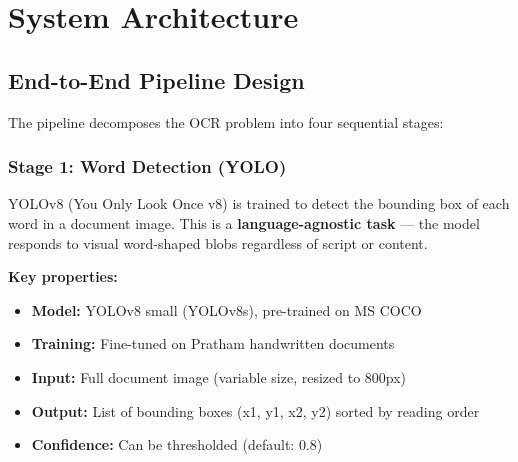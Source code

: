 \documentclass[14pt,a4paper]{article}
\begin{document}
\section{System Architecture}

\subsection{End-to-End Pipeline Design}

The pipeline decomposes the OCR problem into four sequential stages:

\begin{center}
\end{center}

\subsubsection{Stage 1: Word Detection (YOLO)}

YOLOv8 (You Only Look Once v8) is trained to detect the bounding box of each word in a document image. This is a \textbf{language-agnostic task} — the model responds to visual word-shaped blobs regardless of script or content.

\textbf{Key properties:}
\begin{itemize}
    \item \textbf{Model:} YOLOv8 small (YOLOv8s), pre-trained on MS COCO
    \item \textbf{Training:} Fine-tuned on Pratham handwritten documents
    \item \textbf{Input:} Full document image (variable size, resized to 800px)
    \item \textbf{Output:} List of bounding boxes (x1, y1, x2, y2) sorted by reading order
    \item \textbf{Confidence:} Can be thresholded (default: 0.8)
\end{itemize}
\end{document}
